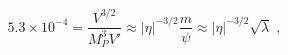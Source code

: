 \begin{equation}
5.3\times 10^{-4} = \frac{V^{3/2}}{M_P^3 V'} \approx |\eta|^{-3/2}
\frac{m}{\psi} \approx |\eta|^{-3/2} \sqrt{\lambda} \;,
\end{equation}


